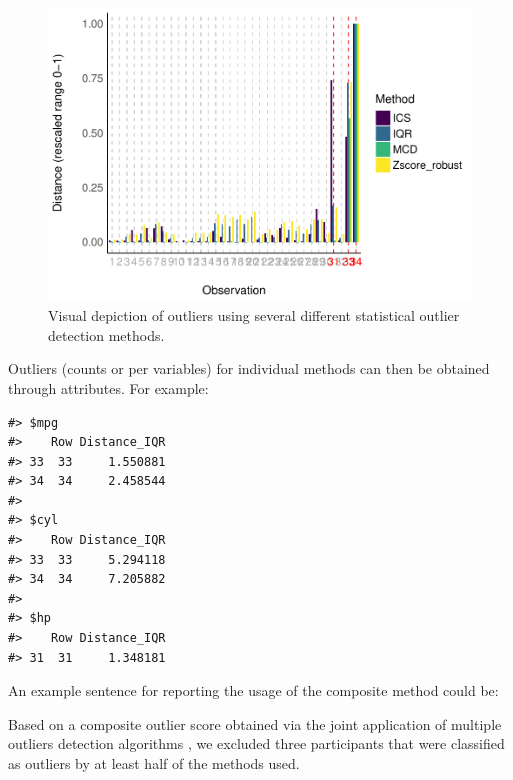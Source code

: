 \documentclass[mathematics,article,submit,moreauthors,pdftex]{mdpi}
\newenvironment{Shaded}{\begin{snugshade}}{\end{snugshade}}
\newcommand{\FunctionTok}[1]{\textcolor[rgb]{0.00,0.00,0.00}{#1}}
\newcommand{\NormalTok}[1]{#1}
\newcommand{\SpecialCharTok}[1]{\textcolor[rgb]{0.00,0.00,0.00}{#1}}
\begin{document}
\begin{figure}
\includegraphics[width=1\linewidth]{paper_files/figure-latex/multimethod-1} \caption{Visual depiction of outliers using several different statistical outlier detection methods.}\label{fig:multimethod}
\end{figure}

Outliers (counts or per variables) for individual methods can then be
obtained through attributes. For example:

\begin{Shaded}
\end{Shaded}

\begin{verbatim}
#> $mpg
#>    Row Distance_IQR
#> 33  33     1.550881
#> 34  34     2.458544
#> 
#> $cyl
#>    Row Distance_IQR
#> 33  33     5.294118
#> 34  34     7.205882
#> 
#> $hp
#>    Row Distance_IQR
#> 31  31     1.348181
\end{verbatim}

An example sentence for reporting the usage of the composite method
could be:

Based on a composite outlier score \citep[see the `check\_outliers()'
function in the `performance' R package,][]{ludecke2021performance}
obtained via the joint application of multiple outliers detection
algorithms \citetext{\citealp[(a) median absolute deviation (MAD)-based
robust \emph{z} scores,][]{leys2013outliers}; \citealp[(b) interquartile
range (IQR), (c) Mahalanobis minimum covariance determinant
(MCD),][]{leys2019outliers}; \citealp[and (d) invariant coordinate
selection (ICS),][]{archimbaud2018ics}}, we excluded three participants
that were classified as outliers by at least half of the methods used.
\end{document}
